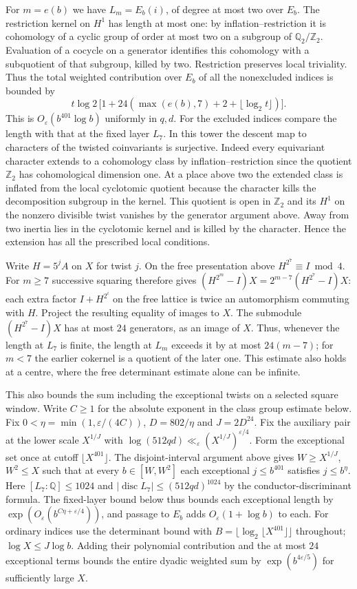 \documentclass[11pt]{amsart}
\theoremstyle{definition}
\theoremstyle{remark}
\begin{document}
For $m=e(b)$ we have $L_m=E_b(i)$, of degree at most two over
$E_b$. The restriction kernel on $H^1$ has length at most one:
by inflation--restriction it is cohomology of a cyclic group of
order at most two on a subgroup of $\mathbb Q_2/\mathbb Z_2$.
Evaluation of a cocycle on a generator identifies this cohomology
with a subquotient of that subgroup, killed by two. Restriction
preserves local triviality. Thus the total weighted contribution
over $E_b$ of all the nonexcluded indices is bounded by
\[
 t\log2\,\bigl[1+24(\max(e(b),7)+2+\lfloor\log_2 t\rfloor)\bigr].
\]
This is $O_\varepsilon(b^{401}\log b)$ uniformly in $q,d$.
For the excluded indices compare the length with that at the fixed layer $L_7$. In this tower the descent map to
characters of the twisted coinvariants is surjective. Indeed every
equivariant character extends to a cohomology class by
inflation--restriction since the quotient $\mathbb Z_2$ has
cohomological dimension one. At a place above two the extended
class is inflated from the local cyclotomic quotient because the
character kills the decomposition subgroup in the kernel. This
quotient is open in $\mathbb Z_2$ and its $H^1$ on the nonzero
divisible twist vanishes by the generator argument above. Away
from two inertia lies in the cyclotomic kernel and is killed by
the character. Hence the extension has all the prescribed local
conditions.

Write $H=5^j A$ on $X$ for twist $j$. On the free presentation
above $H^{2^7}\equiv I\bmod4$. For $m\ge7$ successive squaring
therefore gives $(H^{2^m}-I)X=2^{m-7}(H^{2^7}-I)X$:
each extra factor $I+H^{2^i}$ on the free lattice is twice
an automorphism commuting with $H$. Project the resulting equality
of images to $X$. The submodule $(H^{2^7}-I)X$ has at most
$24$ generators, as an image of $X$. Thus, whenever the length
at $L_7$ is finite, the length at $L_m$ exceeds it by at most
$24(m-7)$; for $m<7$ the earlier cokernel is a quotient of the
later one. This estimate also holds at a centre, where the free
determinant estimate alone can be infinite.

This also bounds the sum including the exceptional twists on a selected
square window. Write $C\ge1$ for the absolute exponent in the class
group estimate below. Fix $0<\eta=\min(1,\varepsilon/(4C))$,
$D=802/\eta$ and $J=2D^{24}$. Fix the auxiliary pair at the lower
scale $X^{1/J}$ with $\log(512qd)\ll_\varepsilon
(X^{1/J})^{\varepsilon/4}$. Form the exceptional set once at cutoff
$\lfloor X^{401}\rfloor$. The disjoint-interval argument above gives
$W\ge X^{1/J}$, $W^2\le X$ such that at every $b\in[W,W^2]$
each exceptional $j\le b^{401}$ satisfies $j\le b^\eta$.
Here $[L_7:\mathbb Q]\le1024$ and $|\operatorname{disc}L_7|
\le(512qd)^{1024}$ by the conductor-discriminant formula.
The fixed-layer bound below thus bounds each exceptional length by
$\exp(O_\varepsilon(b^{C\eta+\varepsilon/4}))$, and passage to
$E_b$ adds $O_\varepsilon(1+\log b)$ to each. For ordinary indices
use the determinant bound with $B=\lfloor\log_2\lfloor
X^{401}\rfloor\rfloor$ throughout; $\log X\le J\log b$.
Adding their polynomial contribution and the at most $24$ exceptional
terms bounds the entire dyadic weighted sum by
$\exp(b^{4\varepsilon/5})$ for sufficiently large $X$.
\end{document}
